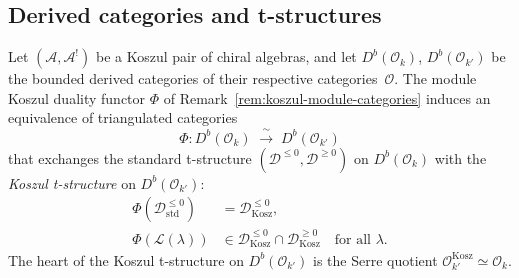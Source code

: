 \subsection{Derived categories and t-structures}
\label{sec:derived-t-structures}

\begin{proposition}
\label{prop:koszul-t-structures}
Let $(\mathcal{A}, \mathcal{A}^!)$ be a Koszul pair of chiral
algebras, and let $D^b(\mathcal{O}_k)$,
$D^b(\mathcal{O}_{k'})$ be the bounded derived categories of
their respective categories~$\mathcal{O}$.  The module Koszul
duality functor $\Phi$ of
Remark~\textup{\ref{rem:koszul-module-categories}} induces an
equivalence of triangulated categories
\begin{equation}\label{eq:derived-koszul}
\Phi\colon D^b(\mathcal{O}_k)
\;\xrightarrow{\;\sim\;}\;
D^b(\mathcal{O}_{k'})
\end{equation}
that exchanges the standard t-structure $(\mathcal{D}^{\leq 0},
\mathcal{D}^{\geq 0})$ on $D^b(\mathcal{O}_k)$ with the
\emph{Koszul t-structure} on $D^b(\mathcal{O}_{k'})$:
\begin{align}
\Phi(\mathcal{D}^{\leq 0}_{\mathrm{std}})
&= \mathcal{D}^{\leq 0}_{\mathrm{Kosz}}, \\
\Phi(\mathcal{L}(\lambda))
&\in \mathcal{D}^{\leq 0}_{\mathrm{Kosz}}
  \cap \mathcal{D}^{\geq 0}_{\mathrm{Kosz}}
\quad \text{for all } \lambda.
\end{align}
The heart of the Koszul t-structure on $D^b(\mathcal{O}_{k'})$
is the Serre quotient
$\mathcal{O}_{k'}^{\mathrm{Kosz}} \simeq \mathcal{O}_k$.
\end{proposition}

